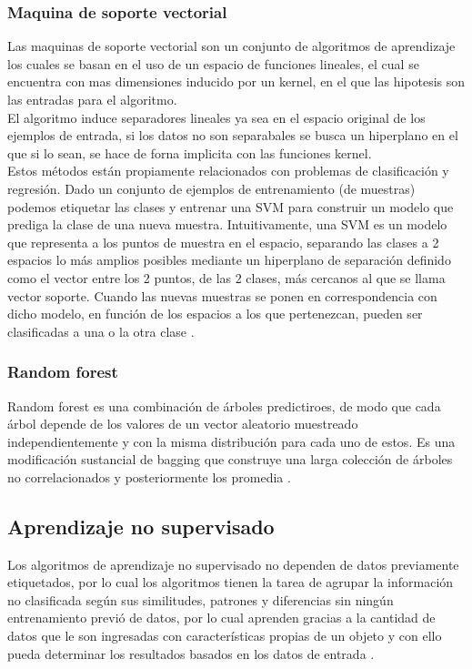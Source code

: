 \subsubsection{Maquina de soporte vectorial}
Las maquinas de soporte vectorial son un conjunto de algoritmos de aprendizaje los cuales se basan en el uso de un espacio de funciones lineales, 
el cual se encuentra con mas dimensiones inducido por un kernel, en el que las hipotesis son las entradas para el algoritmo. \\
El algoritmo induce separadores lineales ya sea en el espacio original de los ejemplos de entrada, si los datos no son separabales se busca un hiperplano 
en el que si lo sean, se hace de forna implicita con las funciones kernel.\\

Estos métodos están propiamente relacionados con problemas de clasificación y regresión. Dado un conjunto de ejemplos de entrenamiento (de muestras) 
podemos etiquetar las clases y entrenar una SVM para construir un modelo que prediga la clase de una nueva muestra. Intuitivamente, una SVM es un modelo 
que representa a los puntos de muestra en el espacio, separando las clases a 2 espacios lo más amplios posibles mediante un hiperplano de separación definido 
como el vector entre los 2 puntos, de las 2 clases, más cercanos al que se llama vector soporte. Cuando las nuevas muestras se ponen en correspondencia con dicho 
modelo, en función de los espacios a los que pertenezcan, pueden ser clasificadas a una o la otra clase \citep{CT8}.

\subsubsection{Random forest}
Random forest es una combinación de árboles predictiroes, de modo que cada árbol depende de los valores de un vector 
aleatorio muestreado independientemente y con la misma distribución para cada uno de estos. Es una modificación sustancial de bagging que construye una 
larga colección de árboles no correlacionados y posteriormente los promedia \citep{CT9}.

\subsection{Aprendizaje no supervisado}
Los algoritmos de aprendizaje no supervisado no dependen de datos previamente etiquetados, por lo cual los algoritmos 
tienen la tarea de agrupar la información no clasificada según sus similitudes, patrones y diferencias sin ningún entrenamiento 
previó de datos, por lo cual aprenden gracias a la cantidad de datos que le son ingresadas con características propias de un 
objeto y con ello pueda determinar los resultados basados en los datos de entrada \citep{CT10}.


